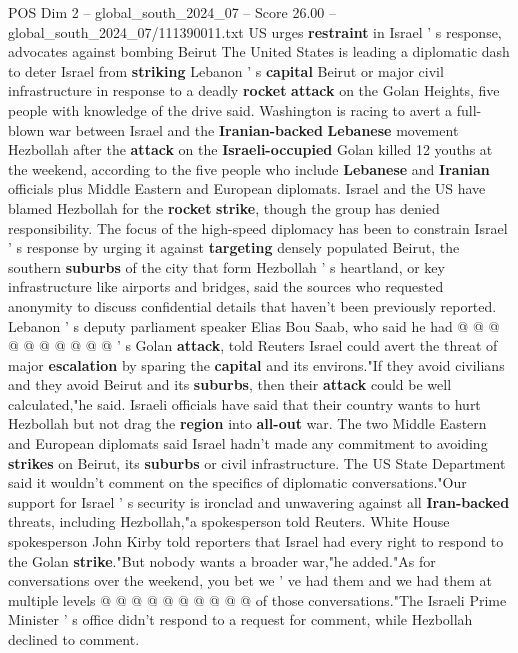 \begin{textsample}{POS Dim 2 – global\_south\_2024\_07 – Score 26.00 – global\_south\_2024\_07/111390011.txt}  \label{ex:f2_pos_065}
US urges \textbf{restraint} in Israel ' s response, advocates against bombing Beirut The United States is leading a diplomatic dash to deter Israel from \textbf{striking} Lebanon ' s \textbf{capital} Beirut or major civil infrastructure in response to a deadly \textbf{rocket} \textbf{attack} on the Golan Heights, five people with knowledge of the drive said.
Washington is racing to avert a full-blown war between Israel and the \textbf{Iranian-backed} \textbf{Lebanese} movement Hezbollah after the \textbf{attack} on the \textbf{Israeli-occupied} Golan killed 12 youths at the weekend, according to the five people who include \textbf{Lebanese} and \textbf{Iranian} officials plus Middle Eastern and European diplomats.
Israel and the US have blamed Hezbollah for the \textbf{rocket} \textbf{strike}, though the group has denied responsibility.
The focus of the high-speed diplomacy has been to constrain Israel ' s response by urging it against \textbf{targeting} densely populated Beirut, the southern \textbf{suburbs} of the city that form Hezbollah ' s heartland, or key infrastructure like airports and bridges, said the sources who requested anonymity to discuss confidential details that haven't been previously reported.
Lebanon ' s deputy parliament speaker Elias Bou Saab, who said he had @ @ @ @ @ @ @ @ @ @ ' s Golan \textbf{attack}, told Reuters Israel could avert the threat of major \textbf{escalation} by sparing the \textbf{capital} and its environs."If they avoid civilians and they avoid Beirut and its \textbf{suburbs}, then their \textbf{attack} could be well calculated,"he said.
Israeli officials have said that their country wants to hurt Hezbollah but not drag the \textbf{region} into \textbf{all-out} war.
The two Middle Eastern and European diplomats said Israel hadn't made any commitment to avoiding \textbf{strikes} on Beirut, its \textbf{suburbs} or civil infrastructure.
The US State Department said it wouldn't comment on the specifics of diplomatic conversations."Our support for Israel ' s security is ironclad and unwavering against all \textbf{Iran-backed} threats, including Hezbollah,"a spokesperson told Reuters.
White House spokesperson John Kirby told reporters that Israel had every right to respond to the Golan \textbf{strike}."But nobody wants a broader war,"he added."As for conversations over the weekend, you bet we ' ve had them and we had them at multiple levels @ @ @ @ @ @ @ @ @ @ of those conversations."The Israeli Prime Minister ' s office didn't respond to a request for comment, while Hezbollah declined to comment.

\end{textsample}
